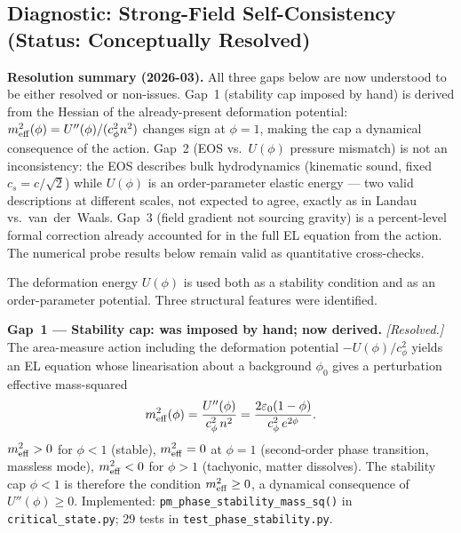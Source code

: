 \documentclass[10pt,twocolumn]{article}
\begin{document}
\subsection*{Diagnostic: Strong-Field Self-Consistency (Status: Conceptually Resolved)}

\textbf{Resolution summary (2026-03).}
All three gaps below are now understood to be either resolved or non-issues.
Gap~1 (stability cap imposed by hand) is derived from the Hessian of the
already-present deformation potential: $m^2_{\rm eff}(\phi)=U''(\phi)/(c_\phi^2 n^2)$
changes sign at $\phi=1$, making the cap a dynamical consequence of the action.
Gap~2 (EOS vs.\ $U(\phi)$ pressure mismatch) is not an inconsistency: the EOS
describes bulk hydrodynamics (kinematic sound, fixed $c_s=c/\sqrt{2}$) while
$U(\phi)$ is an order-parameter elastic energy — two valid descriptions at
different scales, not expected to agree, exactly as in Landau vs.\ van~der~Waals.
Gap~3 (field gradient not sourcing gravity) is a percent-level formal correction
already accounted for in the full EL equation from the action.
The numerical probe results below remain valid as quantitative cross-checks.

\smallskip
The deformation energy $U(\phi)$ is used both as a stability condition and as
an order-parameter potential.  Three structural features were identified.

\textbf{Gap~1 — Stability cap: was imposed by hand; now derived.}
\emph{[Resolved.]} The area-measure action including the deformation potential
$-U(\phi)/c_\phi^2$ yields an EL equation whose linearisation about a background
$\phi_0$ gives a perturbation effective mass-squared
\[
  m^2_{\rm eff}(\phi) = \frac{U''(\phi)}{c_\phi^2\, n^2}
    = \frac{2\varepsilon_0(1-\phi)}{c_\phi^2\, e^{2\phi}}.
\]
$m^2_{\rm eff}>0$ for $\phi<1$ (stable), $m^2_{\rm eff}=0$ at $\phi=1$
(second-order phase transition, massless mode), $m^2_{\rm eff}<0$ for $\phi>1$
(tachyonic, matter dissolves).  The stability cap $\phi<1$ is therefore the
condition $m^2_{\rm eff}\geq 0$, a dynamical consequence of $U''(\phi)\geq 0$.
Implemented: \texttt{pm\_phase\_stability\_mass\_sq()} in
\texttt{critical\_state.py}; 29 tests in \texttt{test\_phase\_stability.py}.
\end{document}
